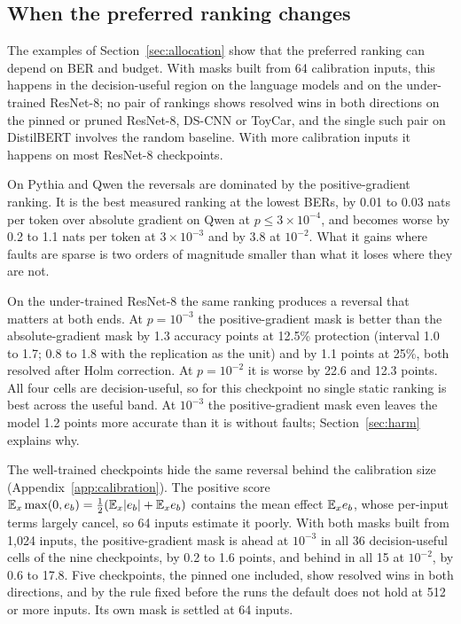 \subsection{When the preferred ranking changes}\label{sec:reversals}
The examples of Section~\ref{sec:allocation} show that the preferred ranking can depend on BER and budget. With masks built from 64 calibration inputs, this happens in the decision-useful region on the language models and on the under-trained ResNet-8; no pair of rankings shows resolved wins in both directions on the pinned or pruned ResNet-8, DS-CNN or ToyCar, and the single such pair on DistilBERT involves the random baseline. With more calibration inputs it happens on most ResNet-8 checkpoints.

On Pythia and Qwen the reversals are dominated by the positive-gradient ranking. It is the best measured ranking at the lowest BERs, by 0.01 to 0.03 nats per token over absolute gradient on Qwen at $p\le3\times10^{-4}$, and becomes worse by 0.2 to 1.1 nats per token at $3\times10^{-3}$ and by 3.8 at $10^{-2}$. What it gains where faults are sparse is two orders of magnitude smaller than what it loses where they are not.

On the under-trained ResNet-8 the same ranking produces a reversal that matters at both ends. At $p=10^{-3}$ the positive-gradient mask is better than the absolute-gradient mask by 1.3 accuracy points at 12.5\% protection (interval 1.0 to 1.7; 0.8 to 1.8 with the replication as the unit) and by 1.1 points at 25\%, both resolved after Holm correction. At $p=10^{-2}$ it is worse by 22.6 and 12.3 points. All four cells are decision-useful, so for this checkpoint no single static ranking is best across the useful band. At $10^{-3}$ the positive-gradient mask even leaves the model 1.2 points more accurate than it is without faults; Section~\ref{sec:harm} explains why.

The well-trained checkpoints hide the same reversal behind the calibration size (Appendix~\ref{app:calibration}). The positive score $\mathbb{E}_x\max(0,e_b)=\tfrac12(\mathbb{E}_x|e_b|+\mathbb{E}_x e_b)$ contains the mean effect $\mathbb{E}_x e_b$, whose per-input terms largely cancel, so 64 inputs estimate it poorly. With both masks built from 1,024 inputs, the positive-gradient mask is ahead at $10^{-3}$ in all 36 decision-useful cells of the nine checkpoints, by 0.2 to 1.6 points, and behind in all 15 at $10^{-2}$, by 0.6 to 17.8. Five checkpoints, the pinned one included, show resolved wins in both directions, and by the rule fixed before the runs the default does not hold at 512 or more inputs. Its own mask is settled at 64 inputs.

